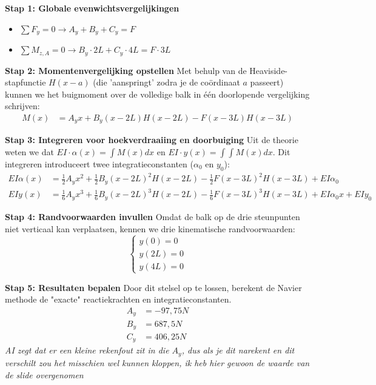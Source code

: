 \documentclass[a4paper,11pt,twoside]{report}
\begin{document}
\textbf{Stap 1: Globale evenwichtsvergelijkingen}
\begin{itemize}
    \item $\sum F_y = 0 \rightarrow A_y + B_y + C_y = F$
    \item $\sum M_{z,A} = 0 \rightarrow B_y \cdot 2L + C_y \cdot 4L = F \cdot 3L$
\end{itemize}

\textbf{Stap 2: Momentenvergelijking opstellen}
Met behulp van de Heaviside-stapfunctie $H(x-a)$ (die 'aanspringt' zodra je de coördinaat $a$
passeert) kunnen we het buigmoment over de volledige balk in één doorlopende vergelijking schrijven:
\begin{align*}
    M(x) & = A_y x + B_y(x - 2L)H(x - 2L) - F(x - 3L)H(x - 3L)
\end{align*}

\textbf{Stap 3: Integreren voor hoekverdraaiing en doorbuiging}
Uit de theorie weten we dat $EI \cdot \alpha(x) = \int M(x) dx$ en
$EI \cdot y(x) = \int \int M(x) dx$. Dit integreren introduceert twee integratieconstanten
($\alpha_0$ en $y_0$):
\begin{align*}
    EI\alpha(x) & = \frac{1}{2}A_y x^2 + \frac{1}{2}B_y(x - 2L)^2 H(x - 2L) - \frac{1}{2}F(x - 3L)^2 H(x - 3L) + EI\alpha_0           \\
    EIy(x)      & = \frac{1}{6}A_y x^3 + \frac{1}{6}B_y(x - 2L)^3 H(x - 2L) - \frac{1}{6}F(x - 3L)^3 H(x - 3L) + EI\alpha_0 x + EIy_0
\end{align*}

\textbf{Stap 4: Randvoorwaarden invullen}
Omdat de balk op de drie steunpunten niet verticaal kan verplaatsen, kennen we drie kinematische
randvoorwaarden:
\[
    \begin{cases}
        y(0) = 0  \\
        y(2L) = 0 \\
        y(4L) = 0
    \end{cases}
\]

\textbf{Stap 5: Resultaten bepalen}
Door dit stelsel op te lossen, berekent de Navier methode de "exacte" reactiekrachten en
integratieconstanten.
\begin{align*}
    A_y & = -97,75 N \\
    B_y & = 687,5 N  \\
    C_y & = 406,25 N
\end{align*}
\textit{AI zegt dat er een kleine rekenfout zit in die $A_y$, dus als je dit narekent en dit
    verschilt zou het misschien wel kunnen kloppen, ik heb hier gewoon de waarde van de slide
    overgenomen}
\end{document}
